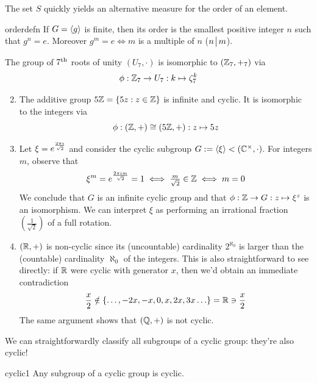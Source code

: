 
The set $S$ quickly yields an alternative measure for the order of an element.



\begin{cor}{}{orderdefn}
If $G=\left\langle g\right\rangle$ is finite, then its order is the smallest positive integer $n$ such that $g^n=e$. Moreover $g^m=e\iff m$ is a multiple of $n$ ($n\!\bigm|\!m$).
\end{cor}


\goodbreak

\begin{examples}{}{}
\exstart The group of $7\textsuperscript{th}$ roots of unity $(U_7,\cdot)$ is isomorphic to $(\mathbb{Z}_7,+_7)$ via
	\[\phi:\mathbb{Z}_7\to U_7:k\mapsto \zeta_7^k\]
\begin{enumerate}\setcounter{enumi}{1}
  \item The additive group $5\mathbb{Z}=\{5z:z\in\mathbb{Z}\}$ is infinite and cyclic. It is isomorphic to the integers via
	\[\phi:(\mathbb{Z},+)\cong(5\mathbb{Z},+):z\mapsto 5z\]
  
	\item Let $\xi=\smash[t]{e^{\frac{2\pi i}{\sqrt 2}}}$ and consider the cyclic subgroup $G:=\left\langle \xi\right\rangle<(\mathbb{C}^\times,\cdot)$. For integers $m$, observe that
	\[\xi^m=e^{\frac{2\pi im}{\sqrt 2}}=1\iff \tfrac m{\sqrt 2}\in\mathbb{Z}\iff m=0\]
	We conclude that $G$ is an infinite cyclic group and that $\phi:\mathbb{Z}\to G:z\mapsto\xi^z$ is an isomorphism. We can interpret $\xi$ as performing an irrational fraction $(\frac 1{\sqrt 2})$ of a full rotation.
	
	\item $(\mathbb{R},+)$ is non-cyclic since its (uncountable) cardinality $2^{\aleph_0}$ is larger than the (countable) cardinality $\aleph_0$ of the integers. This is also straightforward to see directly: if $\mathbb{R}$ were cyclic with generator $x$, then we'd obtain an immediate contradiction
	\[\frac x2\notin\{\ldots,-2x,-x,0,x,2x,3x\ldots\}=\mathbb{R}\ni\frac x2\]
	The same argument shows that $(\mathbb{Q},+)$ is not cyclic.
\end{enumerate}
\end{examples}




We can straightforwardly classify all subgroups of a cyclic group: they're also cyclic!

\begin{thm}{}{cyclic1}
Any subgroup of a cyclic group is cyclic.
\end{thm}

